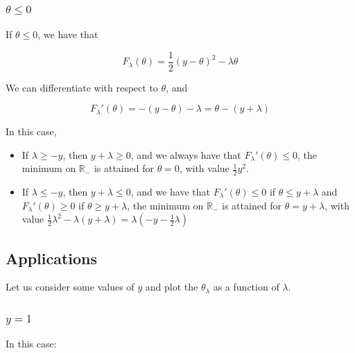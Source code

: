 \documentclass[
10pt, %
a4paper, %
oneside, %
headinclude,footinclude, %
BCOR5mm, %
]{scrartcl}
\begin{document}
\subsubsection{$\theta \leq 0$}%

    If $\theta\leq 0$, we have that

    \begin{equation}
	F_{\lambda}(\theta) = \frac{1}{2}(y-\theta)^2-\lambda \theta
    \end{equation}

    We can differentiate with respect to $\theta$, and

    \begin{equation}
	F_{\lambda}'(\theta) = -(y-\theta)-\lambda = \theta - (y+\lambda)
    \end{equation}

    In this case,

    \begin{itemize}
	\item If $\lambda \geq -y$, then $y+\lambda \geq 0$, and we always have that $F_{\lambda}'(\theta)\leq 0$, the minimum on $ \mathbb{R}_-$ is attained for $\theta=0$, with value $ \frac{1}{2}y^2$.
	\item If $\lambda \leq - y$, then $y+\lambda \leq 0$, and we have that $F_{\lambda}'(\theta)\leq 0$ if $\theta\leq y+\lambda$ and $F_{\lambda}'(\theta)\geq 0$ if $\theta\geq y+\lambda$, the minimum on $\mathbb{R}_-$ is attained for $\theta = y+\lambda$, with value $ \frac{1}{2}\lambda ^2  - \lambda(y+\lambda) = \lambda(-y-\frac{1}{2}\lambda) $ 
    \end{itemize}


\subsection{Applications}%
\label{ssub:Applications}

Let us consider some values of $y$ and plot the $\theta_{\lambda}$ as a function of $\lambda$.

\subsubsection{$y=1$}%
\label{ssub:$y=1$}

In this case:
\end{document}
